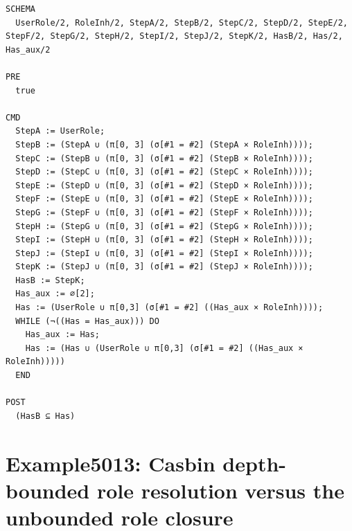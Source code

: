 \documentclass[10pt]{article}
\begin{document}
\begin{Verbatim}[fontsize=\scriptsize,breaklines=true,breakanywhere=true,frame=single,framesep=1.5mm]
SCHEMA
  UserRole/2, RoleInh/2, StepA/2, StepB/2, StepC/2, StepD/2, StepE/2, StepF/2, StepG/2, StepH/2, StepI/2, StepJ/2, StepK/2, HasB/2, Has/2, Has_aux/2

PRE
  true 

CMD
  StepA := UserRole;
  StepB := (StepA ∪ (π[0, 3] (σ[#1 = #2] (StepA × RoleInh))));
  StepC := (StepB ∪ (π[0, 3] (σ[#1 = #2] (StepB × RoleInh))));
  StepD := (StepC ∪ (π[0, 3] (σ[#1 = #2] (StepC × RoleInh))));
  StepE := (StepD ∪ (π[0, 3] (σ[#1 = #2] (StepD × RoleInh))));
  StepF := (StepE ∪ (π[0, 3] (σ[#1 = #2] (StepE × RoleInh))));
  StepG := (StepF ∪ (π[0, 3] (σ[#1 = #2] (StepF × RoleInh))));
  StepH := (StepG ∪ (π[0, 3] (σ[#1 = #2] (StepG × RoleInh))));
  StepI := (StepH ∪ (π[0, 3] (σ[#1 = #2] (StepH × RoleInh))));
  StepJ := (StepI ∪ (π[0, 3] (σ[#1 = #2] (StepI × RoleInh))));
  StepK := (StepJ ∪ (π[0, 3] (σ[#1 = #2] (StepJ × RoleInh))));
  HasB := StepK;
  Has_aux := ∅[2];
  Has := (UserRole ∪ π[0,3] (σ[#1 = #2] ((Has_aux × RoleInh))));
  WHILE (¬((Has = Has_aux))) DO
    Has_aux := Has;
    Has := (Has ∪ (UserRole ∪ π[0,3] (σ[#1 = #2] ((Has_aux × RoleInh)))))
  END

POST
  (HasB ⊆ Has)
\end{Verbatim}

\Needspace{0.45\textheight}

\section{Example5013: Casbin depth-bounded role resolution versus the unbounded role closure}\label{case:Example5013}
\end{document}
